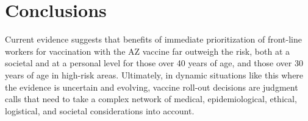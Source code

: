\documentclass[]{interact}
\theoremstyle{plain}%
\theoremstyle{definition}
\theoremstyle{remark}
\begin{document}
\hypertarget{conclusions}{%
\section{Conclusions}\label{conclusions}}

Current evidence suggests that benefits of immediate prioritization of
front-line workers for vaccination with the AZ vaccine far outweigh the
risk, both at a societal and at a personal level for those over 40 years
of age, and those over 30 years of age in high-risk areas. Ultimately,
in dynamic situations like this where the evidence is uncertain and
evolving, vaccine roll-out decisions are judgment calls that need to
take a complex network of medical, epidemiological, ethical, logistical,
and societal considerations into account.






\end{document}
